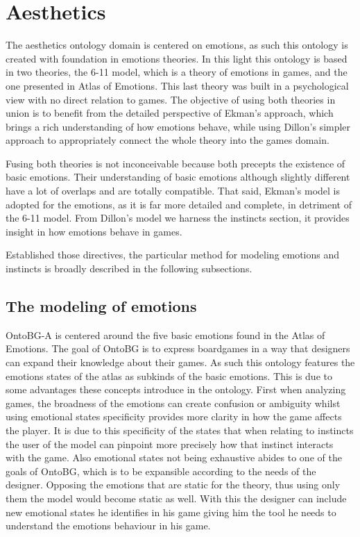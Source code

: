\section{Aesthetics}

The aesthetics ontology domain is centered on emotions, as such this ontology is created with foundation in emotions theories. In this light this ontology is based in two theories, the \cite{dillon_way_2010} 6-11 model, which is a theory of emotions in games, and the one presented in \cite{ekmans_atlas} Atlas of Emotions. This last theory was built in a psychological view with no direct relation to games. The objective of using both theories in union is to benefit from the detailed perspective of Ekman's approach, which brings a rich understanding of how emotions behave, while using Dillon's simpler approach to appropriately connect the whole theory into the games domain.

Fusing both theories is not inconceivable because both precepts the existence of basic emotions. Their understanding of basic emotions although slightly different have a lot of overlaps and are totally compatible. That said, Ekman's model is adopted for the emotions, as it is far more detailed and complete, in detriment of the 6-11 model. From Dillon's model we harness the instincts section, it provides insight in how emotions behave in games. 

Established those directives, the particular method for modeling emotions and instincts is broadly described in the following subsections.

\subsection{The modeling of emotions}

OntoBG-A is centered around the five basic emotions found in the Atlas of Emotions. The goal of OntoBG is to express boardgames in a way that designers can expand their knowledge about their games. As such this ontology features the emotions states of the atlas as subkinds of the basic emotions. This is due to some advantages these concepts introduce in the ontology. First when analyzing games, the broadness of the emotions can create confusion or ambiguity whilst using emotional states specificity provides more clarity in how the game affects the player. It is due to this specificity of the states that when relating to instincts the user of the model can pinpoint more precisely how that instinct interacts with the game. Also emotional states not being exhaustive abides to one of the goals of OntoBG, which is to be expansible according to the needs of the designer. Opposing the emotions that are static for the theory, thus using only them the model would become static as well. With this the designer can include new emotional states he identifies in his game giving him the tool he needs to understand the emotions behaviour in his game.

